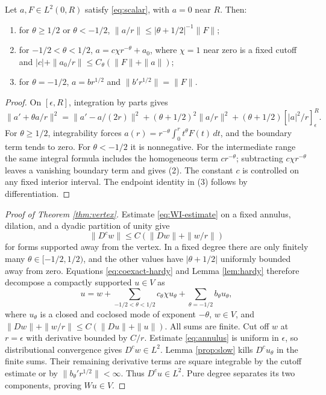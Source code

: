 \begin{lemma}\label{lem:hardy}
Let $a,F\in L^2(0,R)$ satisfy \eqref{eq:scalar}, with $a=0$
near $R$. Then:
\begin{enumerate}
\item for $\theta\ge1/2$ or $\theta<-1/2$,
$\|a/r\|\le|\theta+1/2|^{-1}\|F\|$;
\item for $-1/2<\theta<1/2$,
$a=c\chi r^{-\theta}+a_0$, where $\chi=1$ near zero is a fixed
cutoff and $|c|+\|a_0/r\|\le C_\theta(\|F\|+\|a\|)$;
\item for $\theta=-1/2$, $a=br^{1/2}$ and
$\|b'r^{1/2}\|=\|F\|$.
\end{enumerate}
\end{lemma}
\begin{proof}
On $[\epsilon,R]$, integration by parts gives
\[
 \|a'+\theta a/r\|^2
 =\|a'-a/(2r)\|^2+(\theta+1/2)^2\|a/r\|^2
 +(\theta+1/2)[|a|^2/r]_\epsilon^R.
\]
For $\theta\ge1/2$, integrability forces
$a(r)=r^{-\theta}\int_0^rt^\theta F(t)\,dt$, and the boundary
term tends to zero. For $\theta<-1/2$ it is nonnegative.
For the intermediate range the same integral formula includes
the homogeneous term $cr^{-\theta}$; subtracting $c\chi
r^{-\theta}$ leaves a vanishing boundary term and gives (2).
The constant $c$ is controlled on any fixed interior interval.
The endpoint identity in (3) follows by differentiation.
\end{proof}

\begin{proof}[Proof of Theorem \ref{thm:vertex}]
Estimate \eqref{eq:WI-estimate} on a fixed annulus, dilation,
and a dyadic partition of unity give
\begin{equation}\label{eq:annulus}
 \|D^cw\|\le C(\|Dw\|+\|w/r\|)
\end{equation}
for forms supported away from the vertex. In a fixed degree there
are only finitely many $\theta\in[-1/2,1/2)$, and the other
values have $|\theta+1/2|$ uniformly bounded away from zero.
Equations \eqref{eq:coexact-hardy} and Lemma \ref{lem:hardy}
therefore decompose a compactly supported $u\in V$ as
\[
 u=w+\sum_{-1/2<\theta<1/2}c_\theta\chi u_\theta
       +\sum_{\theta=-1/2}b_\theta u_\theta,
\]
where $u_\theta$ is a closed and coclosed mode of exponent
$-\theta$, $w\in V$, and
$\|Dw\|+\|w/r\|\le C(\|Du\|+\|u\|)$.
All sums are finite. Cut off $w$ at $r=\epsilon$ with derivative
bounded by $C/r$. Estimate \eqref{eq:annulus} is uniform in
$\epsilon$, so distributional convergence gives $D^cw\in L^2$.
Lemma \ref{prop:slow} kills $D^cu_\theta$ in the finite sums.
Their remaining derivative terms are square integrable by the
cutoff estimate or by
$\|b_\theta'r^{1/2}\|<\infty$. Thus $D^cu\in L^2$.
Pure degree separates its two components, proving $Wu\in V$.
\end{proof}

